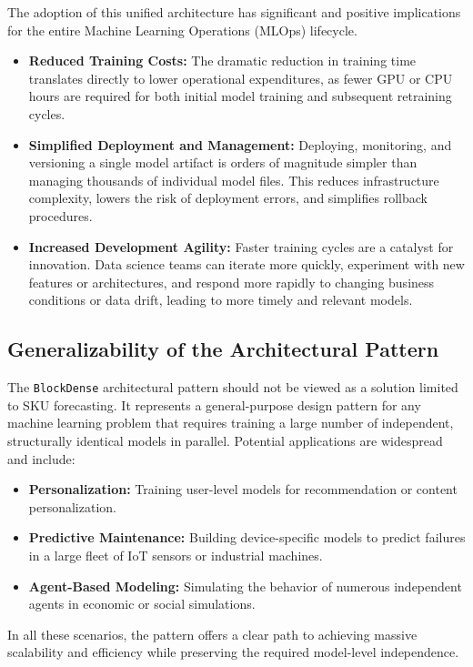 \documentclass{article}
\begin{document}
The adoption of this unified architecture has significant and positive implications for the entire Machine Learning Operations (MLOps) lifecycle.
\begin{itemize}
    \item \textbf{Reduced Training Costs:} The dramatic reduction in training time translates directly to lower operational expenditures, as fewer GPU or CPU hours are required for both initial model training and subsequent retraining cycles.
    \item \textbf{Simplified Deployment and Management:} Deploying, monitoring, and versioning a single model artifact is orders of magnitude simpler than managing thousands of individual model files. This reduces infrastructure complexity, lowers the risk of deployment errors, and simplifies rollback procedures.
    \item \textbf{Increased Development Agility:} Faster training cycles are a catalyst for innovation. Data science teams can iterate more quickly, experiment with new features or architectures, and respond more rapidly to changing business conditions or data drift, leading to more timely and relevant models.
\end{itemize}

\subsection{Generalizability of the Architectural Pattern}

The \texttt{BlockDense} architectural pattern should not be viewed as a solution limited to SKU forecasting. It represents a general-purpose design pattern for any machine learning problem that requires training a large number of independent, structurally identical models in parallel. Potential applications are widespread and include:
\begin{itemize}
    \item \textbf{Personalization:} Training user-level models for recommendation or content personalization.
    \item \textbf{Predictive Maintenance:} Building device-specific models to predict failures in a large fleet of IoT sensors or industrial machines.
    \item \textbf{Agent-Based Modeling:} Simulating the behavior of numerous independent agents in economic or social simulations.
\end{itemize}
In all these scenarios, the pattern offers a clear path to achieving massive scalability and efficiency while preserving the required model-level independence.
\end{document}
